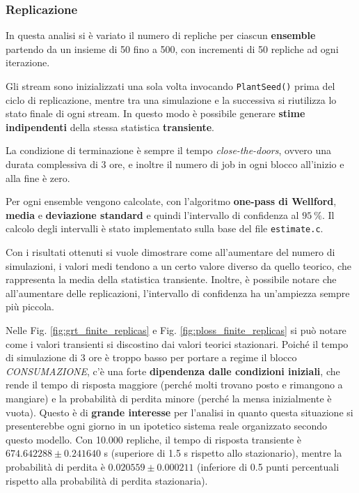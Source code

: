 \documentclass{article}
\begin{document}
\subsubsection{Replicazione}

In questa analisi si è variato il numero di repliche per ciascun \textbf{ensemble} partendo da un insieme di 50 fino a 500, con incrementi di 50 repliche ad ogni iterazione. 

Gli stream sono inizializzati una sola volta invocando \texttt{PlantSeed()} prima del ciclo di replicazione, mentre tra una simulazione e la successiva si riutilizza lo stato finale di ogni stream. In questo modo è possibile generare \textbf{stime indipendenti} della stessa statistica \textbf{transiente}.

La condizione di terminazione è sempre il tempo \textit{close-the-doors}, ovvero una durata complessiva di 3 ore, e inoltre il numero di job in ogni blocco all'inizio e alla fine è zero.

Per ogni ensemble vengono calcolate, con l'algoritmo \textbf{one-pass di Wellford}, \textbf{media} e \textbf{deviazione standard} e quindi l'intervallo di confidenza al $95\ \%$. Il calcolo degli intervalli è stato implementato sulla base del file \texttt{estimate.c}. 

Con i risultati ottenuti si vuole dimostrare come all'aumentare del numero di simulazioni, i valori medi tendono a un certo valore diverso da quello teorico, che rappresenta la media della statistica transiente. Inoltre, è possibile notare che all'aumentare delle replicazioni, l'intervallo di confidenza ha un'ampiezza sempre più piccola. 

Nelle Fig. \ref{fig:grt_finite_replicas} e Fig. \ref{fig:ploss_finite_replicas} si può notare come i valori transienti si discostino dai valori teorici stazionari. Poiché il tempo di simulazione di 3 ore è troppo basso per portare a regime il blocco \textit{CONSUMAZIONE}, c'è una forte \textbf{dipendenza dalle condizioni iniziali}, che rende il tempo di risposta maggiore (perché molti trovano posto e rimangono a mangiare) e la probabilità di perdita minore (perché la mensa inizialmente è vuota). Questo è di \textbf{grande interesse} per l'analisi in quanto questa situazione si presenterebbe ogni giorno in un ipotetico sistema reale organizzato secondo questo modello. Con 10.000 repliche, il tempo di risposta transiente è \(674.642288 \pm 0.241640\) s (superiore di 1.5 s rispetto allo stazionario), mentre la probabilità di perdita è \(0.020559 \pm 0.000211\) (inferiore di 0.5 punti percentuali rispetto alla probabilità di perdita stazionaria).
\end{document}
